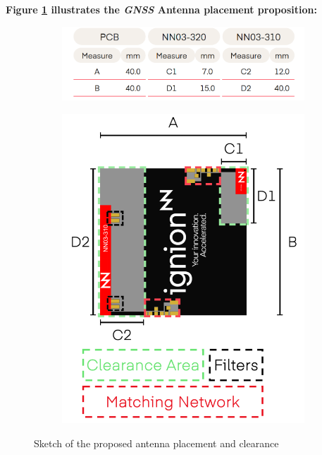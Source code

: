 \documentclass[report.tex]{subfiles}
\begin{document}
\textbf{Figure \ref{fig:ignion} illustrates the \textit{GNSS} Antenna placement proposition:}

\begin{figure}[H]
\centering
\begin{subfigure}{.65\textwidth}
	\centering
	\includegraphics[width=1\textwidth]{Include/Figure/antenna/ignion_2.png}
\end{subfigure}
\begin{subfigure}{.55\textwidth}
	\centering
	\includegraphics[width=1\textwidth]{Include/Figure/antenna/ignion_1.png}
\end{subfigure}
	\caption{Sketch of the proposed antenna placement and clearance}
	\label{fig:ignion}
\end{figure}
\end{document}
